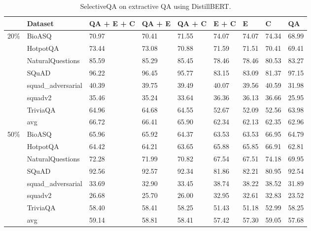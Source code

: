 \documentclass[11pt]{article}
\begin{document}
\begin{table*}[h]
\centering
\begin{tabular}{lllllllll}
\hline
 & Dataset & QA + E + C & QA + E & QA + C & E + C & E & C & QA \\ \hline
20\% & BioASQ & 70.97 & 70.41 & 71.55 & 74.07 & 74.07 & 74.34 & 68.99 \\
 & HotpotQA & 73.44 & 73.08 & 70.88 & 71.59 & 71.51 & 70.41 & 69.41 \\
 & NaturalQuestions & 85.59 & 85.29 & 85.45 & 78.46 & 78.46 & 80.53 & 83.27 \\
 & SQuAD & 96.22 & 96.45 & 95.77 & 83.15 & 83.09 & 81.37 & 97.15 \\
 & squad\_adversarial & 40.39 & 39.75 & 39.49 & 40.07 & 39.56 & 40.59 & 31.98 \\
 & squadv2 & 35.46 & 35.24 & 33.64 & 36.36 & 36.13 & 36.66 & 25.95 \\
 & TriviaQA & 64.96 & 64.68 & 64.55 & 52.67 & 52.09 & 52.56 & 63.98 \\
 & avg & 66.72 & 66.41 & 65.90 & 62.34 & 62.13 & 62.35 & 62.96 \\
50\% & BioASQ & 65.96 & 65.92 & 64.37 & 63.53 & 63.53 & 66.95 & 64.79 \\
 & HotpotQA & 64.42 & 64.21 & 63.65 & 65.88 & 65.85 & 66.91 & 62.81 \\
 & NaturalQuestions & 72.28 & 71.99 & 70.82 & 67.54 & 67.51 & 74.18 & 69.95 \\
 & SQuAD & 92.56 & 92.57 & 92.34 & 81.86 & 82.21 & 80.95 & 92.54 \\
 & squad\_adversarial & 33.69 & 32.90 & 33.45 & 38.74 & 38.22 & 38.52 & 31.89 \\
 & squadv2 & 26.68 & 25.70 & 26.00 & 32.95 & 32.61 & 32.83 & 23.52 \\
 & TriviaQA & 58.40 & 58.41 & 58.25 & 51.43 & 51.18 & 52.99 & 58.25 \\
 & avg & 59.14 & 58.81 & 58.41 & 57.42 & 57.30 & 59.05 & 57.68 \\ \hline
\end{tabular}
\caption{SelectiveQA on extractive QA using DistillBERT.}
\label{tab:selective_distillbert}
\end{table*}
\end{document}
